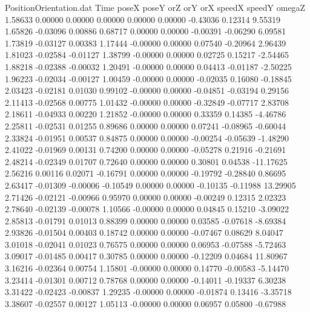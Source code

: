 \begin{filecontents}{PositionOrientation.dat}
Time poseX poseY orZ orY orX speedX speedY omegaZ
   1.58633    0.00000    0.00000     0.00000    0.00000    0.00000   -0.43036    0.12314    9.55319
   1.65826   -0.03096    0.00886     0.68717    0.00000    0.00000   -0.00391   -0.06290    6.09581
   1.73819   -0.03127    0.00383     1.17444   -0.00000    0.00000    0.07540   -0.20964    2.96439
   1.81023   -0.02584   -0.01127     1.38799   -0.00000    0.00000    0.02725    0.15217   -2.54465
   1.88218   -0.02388   -0.00032     1.20491   -0.00000    0.00000    0.04413   -0.01187   -2.50225
   1.96223   -0.02034   -0.00127     1.00459   -0.00000    0.00000   -0.02035    0.16080   -0.18845
   2.03423   -0.02181    0.01030     0.99102   -0.00000    0.00000   -0.04851   -0.03194    0.29156
   2.11413   -0.02568    0.00775     1.01432   -0.00000    0.00000   -0.32849   -0.07717    2.83708
   2.18611   -0.04933    0.00220     1.21852   -0.00000    0.00000    0.33359    0.14385   -4.46786
   2.25811   -0.02531    0.01255     0.89686    0.00000    0.00000    0.07241   -0.08965   -0.60044
   2.33824   -0.01951    0.00537     0.84875    0.00000    0.00000   -0.00254   -0.05639   -1.48290
   2.41022   -0.01969    0.00131     0.74200    0.00000    0.00000   -0.05278    0.21916   -0.21691
   2.48214   -0.02349    0.01707     0.72640    0.00000    0.00000    0.30801    0.04538  -11.17625
   2.56216    0.00116    0.02071    -0.16791    0.00000    0.00000   -0.19792   -0.28840    0.86695
   2.63417   -0.01309   -0.00006    -0.10549    0.00000    0.00000   -0.10135   -0.11988   13.29905
   2.71426   -0.02121   -0.00966     0.95970    0.00000    0.00000   -0.00249    0.12315    2.02323
   2.78640   -0.02139   -0.00078     1.10566   -0.00000    0.00000    0.04845    0.15210   -3.09022
   2.85813   -0.01791    0.01013     0.88399    0.00000    0.00000    0.03585   -0.07618   -8.69384
   2.93826   -0.01504    0.00403     0.18742    0.00000    0.00000   -0.07467    0.08629    8.04047
   3.01018   -0.02041    0.01023     0.76575    0.00000    0.00000    0.06953   -0.07588   -5.72463
   3.09017   -0.01485    0.00417     0.30785    0.00000    0.00000   -0.12209    0.04684   11.80967
   3.16216   -0.02364    0.00754     1.15801   -0.00000    0.00000    0.14770   -0.00583   -5.14470
   3.23414   -0.01301    0.00712     0.78768    0.00000    0.00000   -0.14011   -0.19337    6.30238
   3.31422   -0.02423   -0.00837     1.29235   -0.00000    0.00000   -0.01874    0.13416   -3.35718
   3.38607   -0.02557    0.00127     1.05113   -0.00000    0.00000    0.06957    0.05800   -0.67988

\end{filecontents}
